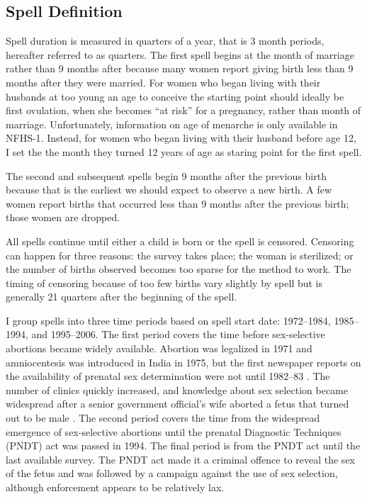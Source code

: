 \documentclass[12pt,letterpaper]{article}
\begin{document}
\subsection{Spell Definition\label{sec:spell_def}}

Spell duration is measured in quarters of a year, that is 3 month periods, hereafter
referred to as quarters.
The first spell begins at the month of marriage rather than 9 months after because many 
women report giving birth less than 9 months after they were married.
For women who began living with their husbands at too young an age to conceive the 
starting point should ideally be first ovulation, when she becomes ``at risk'' for a 
pregnancy, rather than month of marriage.
Unfortunately, information on age of menarche is only available in NFHS-1.
Instead, for women who began living with their husband before age 12, I set the 
the month they turned 12 years of age as staring point for the first spell.

The second and subsequent spells begin 9 months after the previous birth 
because that is the earliest we should expect to observe a new birth.
A few women report births that occurred less than 9 months 
after the previous birth; those women are dropped.

All spells continue until either a child is born or the spell is censored.
Censoring can happen for three reasons:
the survey takes place;
the woman is sterilized;
or the number of births observed becomes too sparse for the method to work.
The timing of censoring because of too few births vary slightly by spell but is generally 
21 quarters after the beginning of the spell.

I group spells into three time periods based on spell start date:
1972--1984, 1985--1994, and 1995--2006.
The first period covers the time before sex-selective abortions became widely available.
Abortion was legalized in 1971 and amniocentesis was introduced
in India in 1975, but the first newspaper reports on the availability of prenatal sex 
determination were not until 1982--83 \citep{Sudha1999,bhat06,Grover2006}.
The number of clinics quickly increased, and knowledge about sex selection became widespread
after a senior government official's wife aborted a fetus that turned out to be male \citep[p.\ 598]{Sudha1999}.
The second period covers the time from the widespread emergence of sex-selective abortions
until the prenatal Diagnostic Techniques (PNDT) act was passed in 1994.
The final period is from the PNDT act until the last available survey.
The PNDT act made it a criminal offence to reveal the sex of the fetus and was
followed by a campaign against the use of sex selection, although
enforcement appears to be relatively lax.
\end{document}
